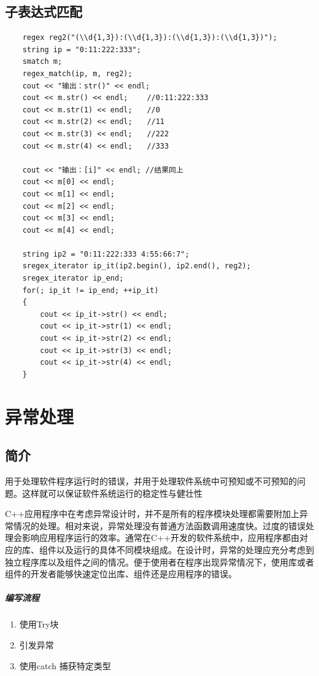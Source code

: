 \documentclass[UTF8,a4paper,12pt]{ctexbook}
\begin{document}
	\section{子表达式匹配}
		\begin{lstlisting}
	regex reg2("(\\d{1,3}):(\\d{1,3}):(\\d{1,3}):(\\d{1,3})");
	string ip = "0:11:222:333";
	smatch m; 
	regex_match(ip, m, reg2);
	cout << "输出：str()" << endl;
	cout << m.str() << endl;　　 //0:11:222:333
	cout << m.str(1) << endl;　　//0
	cout << m.str(2) << endl;　　//11
	cout << m.str(3) << endl;　　//222
	cout << m.str(4) << endl;　　//333
	
	cout << "输出：[i]" << endl; //结果同上
	cout << m[0] << endl;
	cout << m[1] << endl;
	cout << m[2] << endl;
	cout << m[3] << endl;
	cout << m[4] << endl;
	
	string ip2 = "0:11:222:333 4:55:66:7";
	sregex_iterator ip_it(ip2.begin(), ip2.end(), reg2);
	sregex_iterator ip_end;
	for(; ip_it != ip_end; ++ip_it)
	{
		cout << ip_it->str() << endl;
		cout << ip_it->str(1) << endl;
		cout << ip_it->str(2) << endl;
		cout << ip_it->str(3) << endl;
		cout << ip_it->str(4) << endl;
	}
		\end{lstlisting}
		
	
\chapter{异常处理}
	\section{简介}
		用于处理软件程序运行时的错误，并用于处理软件系统中可预知或不可预知的问题。这样就可以保证软件系统运行的稳定性与健壮性
		
		C++应用程序中在考虑异常设计时，并不是所有的程序模块处理都需要附加上异常情况的处理。相对来说，异常处理没有普通方法函数调用速度快。过度的错误处理会影响应用程序运行的效率。通常在C++开发的软件系统中，应用程序都由对应的库、组件以及运行的具体不同模块组成。在设计时，异常的处理应充分考虑到独立程序库以及组件之间的情况。便于使用者在程序出现异常情况下，使用库或者组件的开发者能够快速定位出库、组件还是应用程序的错误。
		
		\paragraph{编写流程}
			\begin{enumerate}
				\item 使用Try块
				\item 引发异常
				\item 使用catch 捕获特定类型
			\end{enumerate}
			
\end{document}
